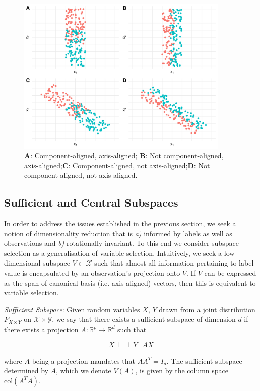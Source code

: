 \documentclass[12pt]{article}
\newenvironment{definition}[1][Definition]{\begin{trivlist}
\item[\hskip \labelsep {\bfseries #1}]}{\end{trivlist}}
\begin{document}
\begin{figure}[htbp]
    \centering
    \includegraphics[width=4in]{../results/figures/ExampleFigures.png}
    \caption{\textbf{A}: Component-aligned, axis-aligned; \textbf{B}: Not component-aligned, axis-aligned;\textbf{C}: Component-aligned, not axis-aligned;\textbf{D}: Not component-aligned, not axis-aligned.\label{fig:examplefigures}}
\end{figure}

\subsection{Sufficient  and Central Subspaces}
In order to address the issues established in the previous section, we seek a notion of dimensionality reduction that is \textit{a)} informed by labels as well as observations and \textit{b)} rotationally invariant. To this end we consider subspace selection as a generalisation of variable selection. Intuitively, we seek a low-dimensional subspace $V \subset \mathcal{X}$ such that almost all information pertaining to label value is encapsulated by an observation's projection onto $V$. If $V$ can be expressed as the span of canonical basis (i.e. axis-aligned) vectors, then this is equivalent to variable selection. 

\begin{definition}
    \textit{Sufficient Subspace}: Given random variables $X$, $Y$ drawn from a joint distribution $P_{X\times Y}$ on $\mathcal{X} \times \mathcal{Y}$, we say that there exists a sufficient subspace of dimension $d$ if there exists a projection $A : \mathbb{R}^p \rightarrow \mathbb{R}^d $ such that 
    
    \[
    X \perp\!\!\!\perp Y\ | \ AX
    \]
    
    where $A$ being a projection mandates that $A {A}^T = I_d$. The sufficient subspace determined by $A$, which we denote $V(A)$, is given by the column space $\text{col}(A^TA)$.
\end{definition}
\end{document}
